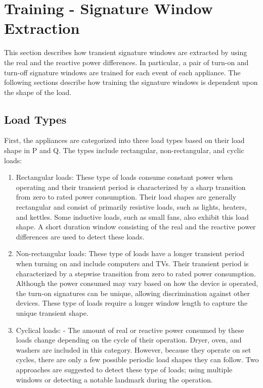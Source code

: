 \documentclass[conference]{IEEEtran}
\begin{document}
\section{Training - Signature Window Extraction}\label{sec:training}
This section describes how transient signature windows are extracted by using the real and the reactive power differences.  In particular, a pair of turn-on and turn-off signature windows are trained for each event of each appliance.  The following sections describe how training the signature windows is dependent upon the shape of the load.  


\subsection{Load Types}
First, the appliances are categorized into three load types based on their load shape in P and Q.  The types include rectangular, non-rectangular, and cyclic loads:

\begin{enumerate}
\item{Rectangular loads:} These type of loads consume constant power when operating and their transient period is characterized by a sharp transition from zero to rated power consumption.  Their load shapes are generally rectangular and consist of primarily resistive loads, such as lights, heaters, and kettles.  Some inductive loads, such as small fans, also exhibit this load shape.  A short duration window consisting of the real and the reactive power differences are used to detect these loads.
\newline
\item{Non-rectangular loads:} These type of loads have a longer transient period when turning on and include computers and TVs.  Their transient period is characterized by a stepwise transition from zero to rated power consumption.  Although the power consumed may vary based on how the device is operated, the turn-on signatures can be unique, allowing discrimination against other devices.  These type of loads require a longer window length to capture the unique transient shape.
\newline
\item{Cyclical loads:} - The amount of real or reactive power consumed by these loads change depending on the cycle of their operation.  Dryer, oven, and washers are included in this category.   However, because they operate on set cycles, there are only a few possible periodic load shapes they can follow.  Two approaches are suggested to detect these type of loads; using multiple windows or detecting a notable landmark during the operation.
\end{enumerate}
\end{document}
